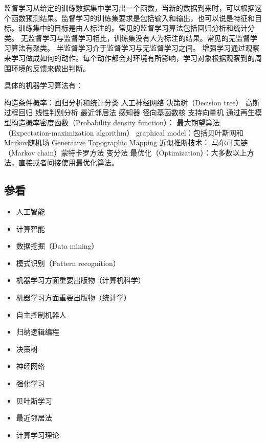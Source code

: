 \documentclass{article}
\begin{document}
    监督学习从给定的训练数据集中学习出一个函数，当新的数据到来时，可以根据这个函数预测结果。监督学习的训练集要求是包括输入和输出，也可以说是特征和目标。训练集中的目标是由人标注的。常见的监督学习算法包括回归分析和统计分类。
    无监督学习与监督学习相比，训练集没有人为标注的结果。常见的无监督学习算法有聚类。
    半监督学习介于监督学习与无监督学习之间。
    增强学习通过观察来学习做成如何的动作。每个动作都会对环境有所影响，学习对象根据观察到的周围环境的反馈来做出判断。

具体的机器学习算法有：

    构造条件概率：回归分析和统计分类
        人工神经网络
        决策树（Decision tree）
        高斯过程回归
        线性判别分析
        最近邻居法
        感知器
        径向基函数核
        支持向量机
    通过再生模型构造概率密度函数（Probability density function）：
        最大期望算法（Expectation-maximization algorithm）
        graphical model：包括贝叶斯网和Markov随机场
        Generative Topographic Mapping
    近似推断技术：
        马尔可夫链（Markov chain）蒙特卡罗方法
        变分法
    最优化（Optimization）：大多数以上方法，直接或者间接使用最优化算法。

\subsection{参看}
\begin{itemize}
\item    人工智能
\item    计算智能
\item    数据挖掘（Data mining）
\item    模式识别（Pattern recognition）
\item    机器学习方面重要出版物（计算机科学）
\item    机器学习方面重要出版物（统计学）
\item    自主控制机器人
\item    归纳逻辑编程
\item    决策树
\item    神经网络
\item    强化学习
\item    贝叶斯学习
\item    最近邻居法
\item    计算学习理论
\end{itemize}
\end{document}
